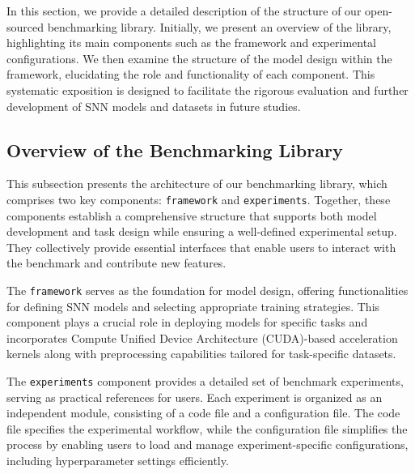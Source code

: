 In this section, we provide a detailed description of the structure of our open-sourced benchmarking library. Initially, we present an overview of the library, highlighting its main components such as the framework and experimental configurations. We then examine the structure of the model design within the framework, elucidating the role and functionality of each component. This systematic exposition is designed to facilitate the rigorous evaluation and further development of SNN models and datasets in future studies.

\subsection{Overview of the Benchmarking Library}
This subsection presents the architecture of our benchmarking library, which comprises two key components: \texttt{framework} and \texttt{experiments}. Together, these components establish a comprehensive structure that supports both model development and task design while ensuring a well-defined experimental setup. They collectively provide essential interfaces that enable users to interact with the benchmark and contribute new features.

The \texttt{framework} serves as the foundation for model design, offering functionalities for defining SNN models and selecting appropriate training strategies. This component plays a crucial role in deploying models for specific tasks and incorporates Compute Unified Device Architecture (CUDA)-based acceleration kernels along with preprocessing capabilities tailored for task-specific datasets.

The \texttt{experiments} component provides a detailed set of benchmark experiments, serving as practical references for users. Each experiment is organized as an independent module, consisting of a code file and a configuration file. The code file specifies the experimental workflow, while the configuration file simplifies the process by enabling users to load and manage experiment-specific configurations, including hyperparameter settings efficiently.

